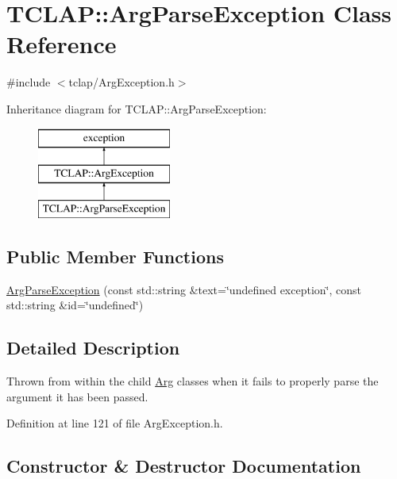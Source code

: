 \hypertarget{class_t_c_l_a_p_1_1_arg_parse_exception}{}\section{T\+C\+L\+A\+P\+:\+:Arg\+Parse\+Exception Class Reference}
\label{class_t_c_l_a_p_1_1_arg_parse_exception}


{\ttfamily \#include $<$tclap/\+Arg\+Exception.\+h$>$}

Inheritance diagram for T\+C\+L\+A\+P\+:\+:Arg\+Parse\+Exception\+:\begin{figure}[H]
\begin{center}
\leavevmode
\includegraphics[height=3.000000cm]{class_t_c_l_a_p_1_1_arg_parse_exception}
\end{center}
\end{figure}
\subsection*{Public Member Functions}
\begin{DoxyCompactItemize}
\item 
\hyperlink{class_t_c_l_a_p_1_1_arg_parse_exception_aa9d9531405e505afd506491526733285}{Arg\+Parse\+Exception} (const std\+::string \&text=\char`\"{}undefined exception\char`\"{}, const std\+::string \&id=\char`\"{}undefined\char`\"{})
\end{DoxyCompactItemize}


\subsection{Detailed Description}
Thrown from within the child \hyperlink{class_t_c_l_a_p_1_1_arg}{Arg} classes when it fails to properly parse the argument it has been passed. 

Definition at line 121 of file Arg\+Exception.\+h.



\subsection{Constructor \& Destructor Documentation}
\hypertarget{class_t_c_l_a_p_1_1_arg_parse_exception_aa9d9531405e505afd506491526733285}{}
